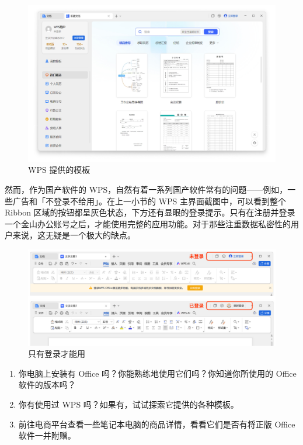 \begin{figure}[htb!]
  \centering
  \includegraphics[width=.8\textwidth]{assets/software/WPS_templates.png}
  \caption{WPS 提供的模板}
  \label{fig:WPS_templates}
\end{figure}

然而，作为国产软件的 WPS，自然有着一系列国产软件常有的问题——例如，一些广告和「不登录不给用」。在上一小节的 WPS 主界面截图中，可以看到整个 Ribbon 区域的按钮都呈灰色状态，下方还有显眼的登录提示。只有在注册并登录一个金山办公账号之后，才能使用完整的应用功能。对于那些注重数据私密性的用户来说，这无疑是一个极大的缺点。

\begin{figure}[htb!]
  \centering
  \includegraphics[width=.8\textwidth]{assets/software/WPS_no_login.pdf}
  \caption{只有登录才能用}
  \label{fig:WPS_no_login}
\end{figure}

\practice

\begin{enumerate}
  \item 你电脑上安装有 Office 吗？你能熟练地使用它们吗？你知道你所使用的 Office 软件的版本吗？
  \item 你有使用过 WPS 吗？如果有，试试探索它提供的各种模板。
  \item 前往电商平台查看一些笔记本电脑的商品详情，看看它们是否有将正版 Office 软件一并附赠。
\end{enumerate}